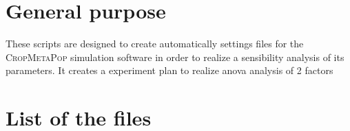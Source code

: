 \documentclass[10pt,a4paper]{article}
\begin{document}
\section{General purpose}
These scripts are designed to create automatically settings files for the \textsc{CropMetaPop} simulation software in order to realize a sensibility analysis of its parameters.
It creates a experiment plan to realize anova analysis of 2 factors


\section{List of the files}
\end{document}

